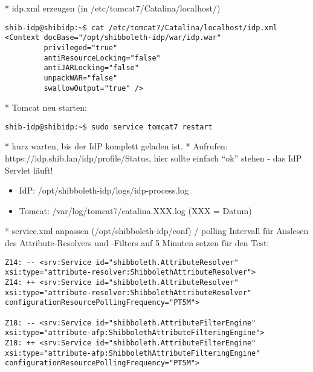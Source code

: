 * idp.xml erzeugen (in /etc/tomcat7/Catalina/localhost/)
\begin{lstlisting}
shib-idp@shibidp:~$ cat /etc/tomcat7/Catalina/localhost/idp.xml 
<Context docBase="/opt/shibboleth-idp/war/idp.war"
		 privileged="true"
		 antiResourceLocking="false"
		 antiJARLocking="false"
		 unpackWAR="false"
		 swallowOutput="true" />
\end{lstlisting}
* Tomcat neu starten:
\begin{lstlisting}
shib-idp@shibidp:~$ sudo service tomcat7 restart
\end{lstlisting}
* kurz warten, bis der IdP komplett geladen ist.
* Aufrufen: https://idp.shib.lan/idp/profile/Status, hier sollte einfach
"`ok"' stehen - das IdP Servlet läuft!
\begin{itemize}
  \item IdP: /opt/shibboleth-idp/logs/idp-process.log
  \item Tomcat: /var/log/tomcat7/catalina.XXX.log (XXX = Datum)
\end{itemize}
* service.xml anpassen (/opt/shibboleth-idp/conf) / polling Intervall für Auslesen des Attribute-Resolvers und -Filters auf 5 Minuten setzen für den Test:
\begin{lstlisting}
Z14: -- <srv:Service id="shibboleth.AttributeResolver" xsi:type="attribute-resolver:ShibbolethAttributeResolver">
Z14: ++ <srv:Service id="shibboleth.AttributeResolver" xsi:type="attribute-resolver:ShibbolethAttributeResolver" configurationResourcePollingFrequency="PT5M">

Z18: -- <srv:Service id="shibboleth.AttributeFilterEngine" xsi:type="attribute-afp:ShibbolethAttributeFilteringEngine">
Z18: ++ <srv:Service id="shibboleth.AttributeFilterEngine" xsi:type="attribute-afp:ShibbolethAttributeFilteringEngine" configurationResourcePollingFrequency="PT5M">
\end{lstlisting}
			
